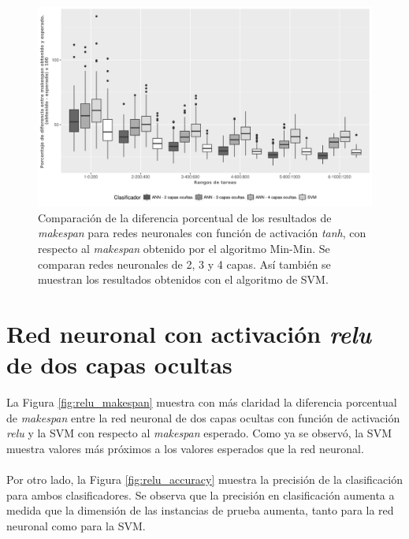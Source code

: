 \begin{figure}[H]
  \centering
  \includegraphics[width=\columnwidth]{imagenes/comparacion_anns_tanh.png}
  \caption{Comparación de  la diferencia porcentual  de los resultados de \textit{makespan} para redes neuronales con función de activación \textit{tanh}, con respecto al \textit{makespan} obtenido por el algoritmo Min-Min.
Se comparan redes neuronales de 2, 3 y 4 capas.
Así también se muestran los resultados obtenidos con el algoritmo de SVM.}
  \label{fig:tanh234}
\end{figure}

\section{Red neuronal con activación \textit{relu} de dos capas ocultas}

La Figura \ref{fig:relu_makespan} muestra con más claridad la diferencia porcentual de \textit{makespan} entre la red neuronal de dos capas ocultas con función de activación \textit{relu} y la SVM con respecto al \textit{makespan} esperado.
Como ya se observó, la SVM muestra valores más próximos a los valores esperados que la red neuronal. 

\paragraph{} Por otro lado, la Figura \ref{fig:relu_accuracy} muestra la precisión de la clasificación para ambos clasificadores.
Se observa que la precisión en clasificación aumenta a medida que la dimensión de las instancias de prueba aumenta, tanto para la red neuronal como para la SVM. 

